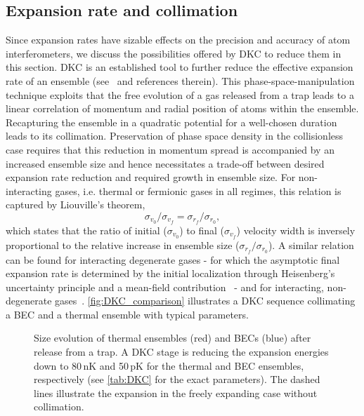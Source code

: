 \subsection{Expansion rate and collimation}
Since expansion rates have sizable effects on the precision and accuracy of atom interferometers, we discuss the possibilities offered by DKC to reduce them in this section. DKC is an established tool to further reduce the effective expansion rate of an ensemble (see~\cite{Corgier2018} and references therein). 
This phase-space-manipulation technique exploits that the free evolution of a gas released from a trap leads to a linear correlation of momentum and radial position of atoms within the ensemble. 
Recapturing the ensemble in a quadratic potential for a well-chosen duration leads to its collimation. 
Preservation of phase space density in the collisionless case requires that this reduction in momentum spread is accompanied by an increased ensemble size and hence necessitates a trade-off between desired expansion rate reduction and required growth in ensemble size. 
For non-interacting gases, i.e. thermal or fermionic gases in all regimes, this relation is captured by Liouville's theorem, 
\begin{equation}
    \sigma_{v_0}/\sigma_{v_f} =  \sigma_{r_f}/\sigma_{r_0},
\end{equation}
which states that the ratio of initial ($\sigma_{v_0}$) to final ($\sigma_{v_f}$) velocity width is inversely proportional to the relative increase in ensemble size ($\sigma_{r_f}/\sigma_{r_0}$). 
A similar relation can be found for interacting degenerate gases - for which the asymptotic final expansion rate is determined by the initial localization through Heisenberg's uncertainty principle and a mean-field contribution~\cite{Loriani2019,Castin1996,Kagan1996} - and for interacting, non-degenerate gases~\cite{GuryOdelin2002,Pedri2003}.
\autoref{fig:DKC_comparison} illustrates a DKC sequence collimating a BEC and a thermal ensemble with typical parameters.
%
\begin{figure}[h!]
    \centering
    
    \caption{Size evolution of thermal ensembles (red) and BECs (blue) after release from a trap. A DKC stage is reducing the expansion energies down to 80\,nK and 50\,pK for the thermal and BEC ensembles, respectively (see \autoref{tab:DKC} for the exact parameters). The dashed lines illustrate the expansion in the freely expanding case without collimation. 
    }
   \label{fig:DKC_comparison}
\end{figure}

